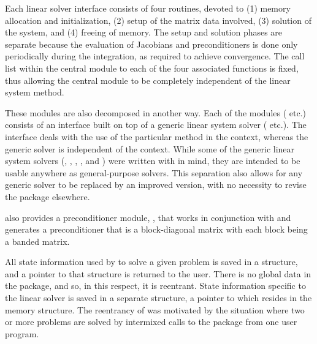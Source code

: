 Each {\idas} linear solver interface consists of four routines, devoted to
(1) memory allocation and initialization, (2) setup of the matrix data
involved, (3) solution of the system, and (4) freeing of memory.  
The setup and solution phases are separate because the evaluation of
Jacobians and preconditioners is done only periodically during the
integration, as required to achieve convergence. The call list within
the central {\idas} module to each of the four associated functions is
fixed, thus allowing the central module to be completely independent
of the linear system method.

These modules are also decomposed in another way.
Each of the modules ({\idadense} etc.) consists of an
interface built on top of a generic linear system solver ({\dense}
etc.).  The interface deals with the use of the particular method in
the {\idas} context, whereas the generic solver is independent of the
context.  While some of the generic linear system solvers ({\dense},
{\band}, {\spgmr}, {\spbcg}, and {\sptfqmr}) were written with
{\sundials} in mind, they are intended to be usable anywhere as
general-purpose solvers.  This separation also allows for any generic
solver to be replaced by an improved version, with no necessity to
revise the {\idas} package elsewhere. 

{\idas} also provides a preconditioner module,
{\idabbdpre}, that works in conjunction with {\nvecp} and generates a 
preconditioner that is a block-diagonal matrix with each block being 
a banded matrix.

All state information used by {\idas} to solve a given problem is saved
in a structure, and a pointer to that structure is returned to the
user.  There is no global data in the {\idas} package, and so, in this
respect, it is reentrant. State information specific to the linear
solver is saved in a separate structure, a pointer to which resides in
the {\idas} memory structure. The reentrancy of {\idas} was motivated
by the situation where two or more problems are solved by
intermixed calls to the package from one user program.

